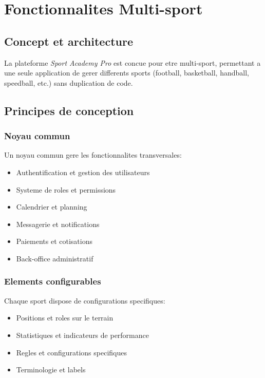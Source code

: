 \chapter{Fonctionnalites Multi-sport}

\section{Concept et architecture}

La plateforme \textit{Sport Academy Pro} est concue pour etre multi-sport, permettant a une seule application de gerer differents sports (football, basketball, handball, speedball, etc.) sans duplication de code.

\section{Principes de conception}

\subsection*{Noyau commun}

Un noyau commun gere les fonctionnalites transversales:

\begin{itemize}[leftmargin=*]
  \item Authentification et gestion des utilisateurs
  \item Systeme de roles et permissions
  \item Calendrier et planning
  \item Messagerie et notifications
  \item Paiements et cotisations
  \item Back-office administratif
\end{itemize}

\subsection*{Elements configurables}

Chaque sport dispose de configurations specifiques:

\begin{itemize}[leftmargin=*]
  \item Positions et roles sur le terrain
  \item Statistiques et indicateurs de performance
  \item Regles et configurations specifiques
  \item Terminologie et labels
\end{itemize}

